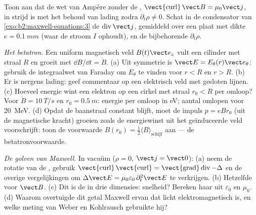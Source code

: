 \begin{exercise}[$\star\star$]\label{exo:b2:maxwell-equations:9}
Toon aan dat de wet van Ampère zonder de ,
$\operatorname{\vect{curl}}
\vect B = \mu_0\vect j$, in strijd is met het
behoud van lading zodra $\partial_t\rho
\ne 0$. Schat in de condensator van
\cref{exo:b2:maxwell-equations:3} de $\operatorname{div}\vect j$, gemiddeld
over een plaat met dikte $e = \qty{0.1}{mm}$ (waar de stroom $I$ ophoudt),
en de bijbehorende $\partial_t\rho$.
\end{exercise}

\begin{exercise}[$\star\star\star$]\label{exo:b2:maxwell-equations:10}
\emph{Het betatron.} Een uniform magnetisch veld $B(t)\vect e_z$ vult een
cilinder met straal $R$ en groeit met $\dd B/\dd t = \dot B$. (a) Uit
symmetrie is $\vect E = E_\theta(r)\vect e_\theta$: gebruik de integraalwet
van Faraday om $E_\theta$ te vinden voor $r < R$ en $r > R$. (b) Er is
nergens lading: geef commentaar op een elektrisch veld met gesloten lijnen.
(c) Hoeveel energie wint een elektron op een cirkel met straal $r_0 < R$ per
omloop? Voor $\dot B = \qty{10}{T/s}$ en $r_0 = \qty{0.5}{m}$: energie per
omloop in eV; aantal omlopen voor \qty{20}{MeV}. (d) Opdat de baanstraal
constant blijft, moet de impuls $p = eBr_0$ (uit de magnetische kracht)
groeien zoals de energiewinst uit het geïnduceerde veld voorschrijft: toon
de voorwaarde $B(r_0) = \tfrac12\langle B\rangle_{\text{schijf}}$ aan --- de
betatronvoorwaarde.
\end{exercise}

\begin{exercise}[$\star\star\star$]\label{exo:b2:maxwell-equations:11}
\emph{De golven van Maxwell.} In vacuüm ($\rho = 0$, $\vect j = \vect 0$):
(a) neem de rotatie van de , gebruik
$\operatorname{\vect{curl}}
\operatorname{\vect{curl}} = \operatorname{\vect{grad}}\operatorname{div} - \Delta$
en de overige vergelijkingen om
$\Delta\vect E = \mu_0\varepsilon_0\,\partial_t^2\vect E$ te verkrijgen. (b)
Hetzelfde voor $\vect B$. (c) Dit is de  in drie
dimensies: snelheid? Bereken haar uit $\varepsilon_0$ en $\mu_0$. (d) Waarom
overtuigde dit getal Maxwell ervan dat licht elektromagnetisch is, en welke
meting van Weber en Kohlrausch gebruikte hij?
\end{exercise}

